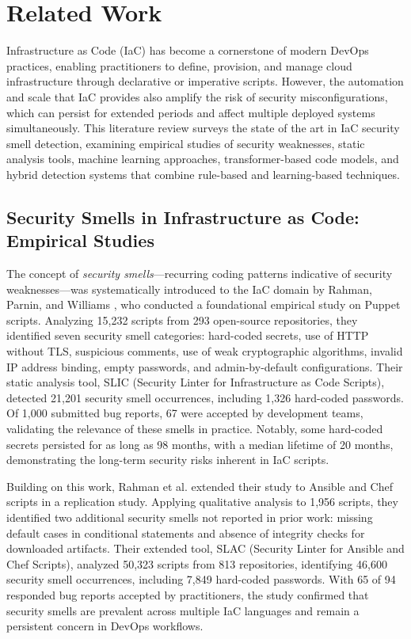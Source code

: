 \section{Related Work}
\label{sec:rw}

Infrastructure as Code (IaC) has become a cornerstone of modern DevOps practices, enabling practitioners to define, provision, and manage cloud infrastructure through declarative or imperative scripts. However, the automation and scale that IaC provides also amplify the risk of security misconfigurations, which can persist for extended periods and affect multiple deployed systems simultaneously. This literature review surveys the state of the art in IaC security smell detection, examining empirical studies of security weaknesses, static analysis tools, machine learning approaches, transformer-based code models, and hybrid detection systems that combine rule-based and learning-based techniques.

\subsection{Security Smells in Infrastructure as Code: Empirical Studies}

The concept of \emph{security smells}—recurring coding patterns indicative of security weaknesses—was systematically introduced to the IaC domain by Rahman, Parnin, and Williams \cite{Rahman19}, who conducted a foundational empirical study on Puppet scripts. Analyzing 15,232 scripts from 293 open-source repositories, they identified seven security smell categories: hard-coded secrets, use of HTTP without TLS, suspicious comments, use of weak cryptographic algorithms, invalid IP address binding, empty passwords, and admin-by-default configurations. Their static analysis tool, SLIC (Security Linter for Infrastructure as Code Scripts), detected 21,201 security smell occurrences, including 1,326 hard-coded passwords. Of 1,000 submitted bug reports, 67 were accepted by development teams, validating the relevance of these smells in practice. Notably, some hard-coded secrets persisted for as long as 98 months, with a median lifetime of 20 months, demonstrating the long-term security risks inherent in IaC scripts.

Building on this work, Rahman et al. \cite{Rahman20} extended their study to Ansible and Chef scripts in a replication study. Applying qualitative analysis to 1,956 scripts, they identified two additional security smells not reported in prior work: missing default cases in conditional statements and absence of integrity checks for downloaded artifacts. Their extended tool, SLAC (Security Linter for Ansible and Chef Scripts), analyzed 50,323 scripts from 813 repositories, identifying 46,600 security smell occurrences, including 7,849 hard-coded passwords. With 65 of 94 responded bug reports accepted by practitioners, the study confirmed that security smells are prevalent across multiple IaC languages and remain a persistent concern in DevOps workflows.

